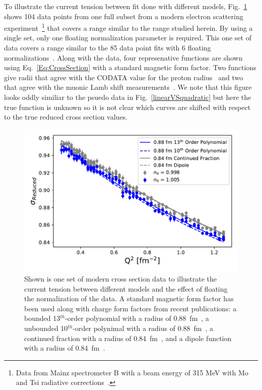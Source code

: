 \documentclass[10pt,aps,prc,twocolumn]{revtex4-1}
\begin{document}
To illustrate the current tension between fit done with different models, Fig.~\ref{RealData} shows 
104 data points from one full subset from a modern electron scattering 
experiment~\footnote{Data from Mainz spectrometer B with a beam energy of 315 MeV with Mo and Tsi radiative 
corrections~\cite{Bernauer:2013tpr}.} 
that covers a range similar to the range studied herein.  By using a single set, only one floating normalization
parameter is required.
This one set of data covers a range similar to the 85 data point fits with 6 floating normalizations~\cite{Rosenfelder:1999cd,Hill:2010yb}.
Along with the data, four represenative functions are shown using Eq.~\ref{Eq:CrossSection} with a standard magnetic form factor.
Two functions give radii that agree with the CODATA value for the proton
radius~\cite{Bernauer:2013tpr,Ye:2017gyb} and two that agree with the muonic Lamb shift measurements~\cite{Higinbotham:2015rja,Griffioen:2015hta}.
We note that this figure looks oddly similiar to the psuedo data in Fig.~\ref{linearVSquadratic} but here the true function is unknown 
so it is not clear which curves are shifted with respect to the true reduced cross section values.

\begin{figure}
\includegraphics[width=\columnwidth]{Figure/RealData.pdf} 
\caption{Shown is one set of modern cross section data to illustrate the current tension between 
different models and the effect of floating the normalization of the data.   A standard magnetic
form factor has been used along with charge form factors from recent publications:  a bounded
13$^{th}$-order polynomial with a radius of 0.88~fm~\cite{Ye:2017gyb}, a unbounded 10$^{th}$-order polynimal with a radius of 0.88~fm~\cite{Bernauer:2013tpr}, 
a continued fraction with a radius of 0.84~fm~\cite{Griffioen:2015hta}, and a dipole function with a radius of 0.84~fm~\cite{Higinbotham:2015rja}. }
\label{RealData}
\end{figure}
\end{document}
